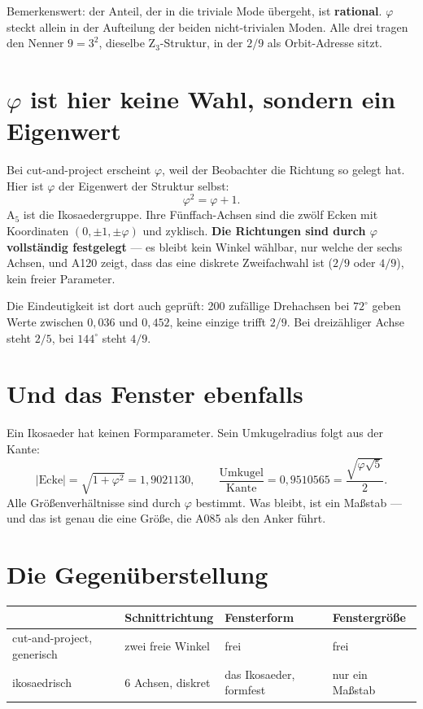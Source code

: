 \documentclass[11pt]{report}
\begin{document}
Bemerkenswert: der Anteil, der in die triviale Mode übergeht, ist
\textbf{rational}. $\varphi$ steckt allein in der Aufteilung der beiden
nicht-trivialen Moden. Alle drei tragen den Nenner $9 = 3^2$, dieselbe
Z$_3$-Struktur, in der $2/9$ als Orbit-Adresse sitzt.

\section{\texorpdfstring{$\varphi$}{phi} ist hier keine Wahl, sondern
ein Eigenwert}

Bei cut-and-project erscheint $\varphi$, weil der Beobachter die
Richtung so gelegt hat. Hier ist $\varphi$ der Eigenwert der Struktur
selbst:
\[
  \varphi^2 = \varphi + 1 .
\]
A$_5$ ist die Ikosaedergruppe. Ihre Fünffach-Achsen sind die zwölf
Ecken mit Koordinaten $(0, \pm1, \pm\varphi)$ und zyklisch. \textbf{Die
Richtungen sind durch $\varphi$ vollständig festgelegt} --- es bleibt
kein Winkel wählbar, nur welche der sechs Achsen, und A120 zeigt, dass
das eine diskrete Zweifachwahl ist ($2/9$ oder $4/9$), kein freier
Parameter.

Die Eindeutigkeit ist dort auch geprüft: 200 zufällige Drehachsen bei
$72^\circ$ geben Werte zwischen $0{,}036$ und $0{,}452$, keine einzige
trifft $2/9$. Bei dreizähliger Achse steht $2/5$, bei $144^\circ$ steht
$4/9$.

\section{Und das Fenster ebenfalls}

Ein Ikosaeder hat keinen Formparameter. Sein Umkugelradius folgt aus
der Kante:
\[
  |\text{Ecke}| = \sqrt{1 + \varphi^2} = 1{,}9021130, \qquad
  \frac{\text{Umkugel}}{\text{Kante}} = 0{,}9510565
  = \frac{\sqrt{\varphi\sqrt5}}{2}.
\]
Alle Größenverhältnisse sind durch $\varphi$ bestimmt. Was bleibt, ist
ein Maßstab --- und das ist genau die eine Größe, die A085 als den
Anker führt.

\section{Die Gegenüberstellung}

\begin{center}
\begin{tabular}{llll}
\toprule
 & Schnittrichtung & Fensterform & Fenstergröße \\
\midrule
cut-and-project, generisch & zwei freie Winkel & frei & frei \\
ikosaedrisch & 6 Achsen, diskret & das Ikosaeder, formfest & nur ein Maßstab \\
\bottomrule
\end{tabular}
\end{center}
\end{document}
